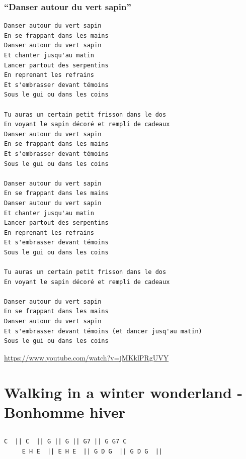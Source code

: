 \documentclass[
]{article}
\begin{document}
\hypertarget{danser-autour-du-vert-sapin}{%
\subsubsection*{``Danser autour du vert
sapin''}\label{danser-autour-du-vert-sapin}}

\begin{verbatim}
Danser autour du vert sapin
En se frappant dans les mains
Danser autour du vert sapin
Et chanter jusqu'au matin
Lancer partout des serpentins
En reprenant les refrains
Et s'embrasser devant témoins
Sous le gui ou dans les coins

Tu auras un certain petit frisson dans le dos
En voyant le sapin décoré et rempli de cadeaux
Danser autour du vert sapin
En se frappant dans les mains
Et s'embrasser devant témoins
Sous le gui ou dans les coins

Danser autour du vert sapin
En se frappant dans les mains
Danser autour du vert sapin
Et chanter jusqu'au matin
Lancer partout des serpentins
En reprenant les refrains
Et s'embrasser devant témoins
Sous le gui ou dans les coins

Tu auras un certain petit frisson dans le dos
En voyant le sapin décoré et rempli de cadeaux

Danser autour du vert sapin
En se frappant dans les mains
Danser autour du vert sapin
Et s'embrasser devant témoins (et dancer jusq'au matin)
Sous le gui ou dans les coins
\end{verbatim}

\url{https://www.youtube.com/watch?v=jMKklPRgUVY}

\hypertarget{walking-in-a-winter-wonderland---bonhomme-hiver}{%
\section{Walking in a winter wonderland - Bonhomme
hiver}\label{walking-in-a-winter-wonderland---bonhomme-hiver}}

\hypertarget{section-15}{%
\subsection*{}\label{section-15}}

\begin{verbatim}
C  || C  || G || G || G7 || G G7 C
     E H E  || E H E  || G D G  || G D G  ||
\end{verbatim}
\end{document}
